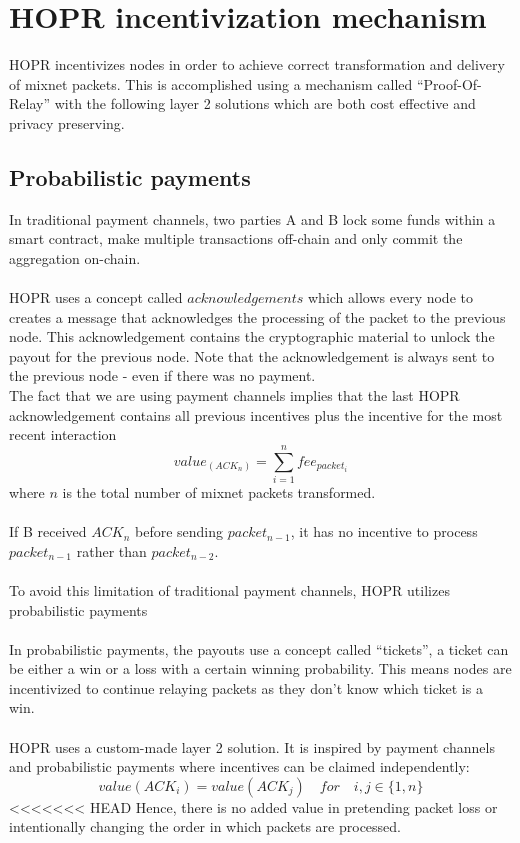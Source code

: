\section{HOPR incentivization mechanism}
HOPR incentivizes nodes in order to achieve correct transformation and delivery of mixnet packets.
This is accomplished using a mechanism called “Proof-Of-Relay” with the following layer 2 solutions which are both cost effective and privacy preserving.

\subsection{Probabilistic payments}
In traditional payment channels, two parties A and B lock some funds within a smart contract, make multiple transactions off-chain and only commit the aggregation on-chain.
\\~\\HOPR uses a concept called $acknowledgements$ which allows every node to creates a message that acknowledges the processing of the packet to the previous node. This acknowledgement contains the cryptographic material to unlock the payout for the previous node. Note that the acknowledgement is always sent to the previous node - even if there was no payment.
\\The fact that we are using payment channels implies that the last HOPR acknowledgement contains all previous incentives plus the incentive for the most recent interaction
$$value_(ACK_n) =\sum_{i=1}^nfee_{packet_i}$$ where $n$ is the total number of mixnet packets transformed.
\\~\\If B received $ACK_n$ before sending $packet_{n-1}$, it has no incentive to process $packet_{n-1}$ rather than $packet_{n-2}$.
\\~\\To avoid this limitation of traditional payment channels, HOPR utilizes probabilistic payments
\\~\\In probabilistic payments, the payouts use a concept called “tickets”, a ticket can be either a win or a loss with a certain winning probability. This means nodes are incentivized to continue relaying packets as they don’t know which ticket is a win.
\\~\\HOPR uses a custom-made layer 2 solution. It is inspired by payment channels and probabilistic payments where incentives can be claimed independently:
$$value ( ACK_i )=value ( ACK_j ) \quad for \quad i,j\in \{1,n\}$$
<<<<<<< HEAD
Hence, there is no added value in pretending packet loss or intentionally changing the order in which packets are processed. 
